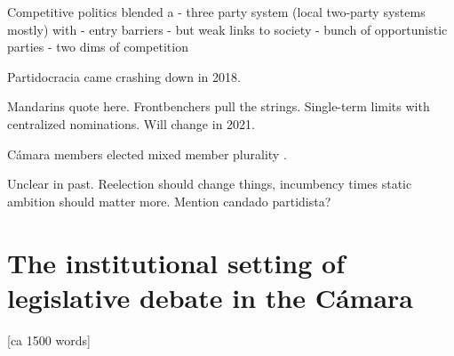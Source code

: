 \documentclass[letter,12pt]{article}
\begin{document}

Competitive politics blended a
- three party system (local two-party systems mostly) with 
- entry barriers
- but weak links to society
- bunch of opportunistic parties
- two dims of competition

Partidocracia came crashing down in 2018.


Mandarins quote here. Frontbenchers pull the strings. Single-term limits with centralized nominations. Will change in 2021. 


Cámara members elected mixed member plurality \citep{weldonMixedMemberSys2001}.


Unclear in past. Reelection should change things, incumbency times static ambition should matter more. Mention candado partidista? 

\section{The institutional setting of legislative debate in the Cámara} [ca 1500 words]

\end{document}

